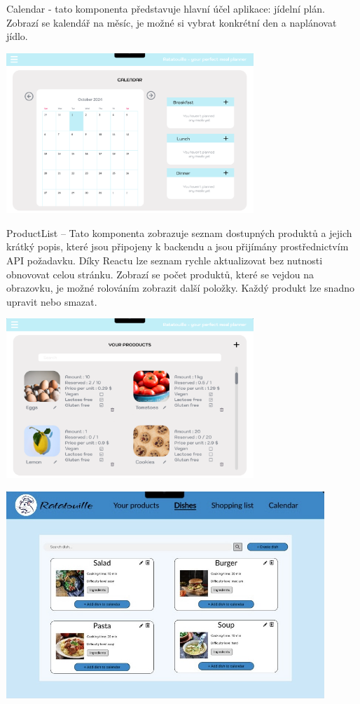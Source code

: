 \documentclass[a4paper,12pt]{article}
\begin{document}
 Calendar - tato komponenta představuje hlavní účel aplikace: jídelní plán.  Zobrazí se kalendář na měsíc, je možné si vybrat konkrétní den a naplánovat jídlo.
\begin{center}

\includegraphics[width=0.7\textwidth]{figma_calendar.png}
\end{center}
ProductList – Tato komponenta zobrazuje seznam dostupných produktů a jejich krátký popis, které jsou připojeny k backendu a jsou přijímány prostřednictvím API požadavku. Díky Reactu lze seznam rychle aktualizovat bez nutnosti obnovovat celou stránku. Zobrazí se počet produktů, které se vejdou na obrazovku, je možné rolováním zobrazit další položky. Každý produkt lze snadno upravit nebo smazat.
\begin{center}
\includegraphics[width=0.7\textwidth]{figma_product.png}
\end{center}
\begin{center}
\includegraphics[width=0.9\textwidth]{dishes.JPG}
\end{center}
\end{document}
